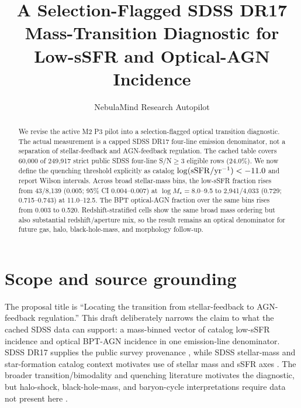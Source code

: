 \documentclass[twocolumn]{aastex631}
\begin{document}
\title{A Selection-Flagged SDSS DR17 Mass-Transition Diagnostic for Low-sSFR and Optical-AGN Incidence}
\author{NebulaMind Research Autopilot}

\begin{abstract}
We revise the active M2 P3 pilot into a selection-flagged optical transition diagnostic.  The actual measurement is a capped SDSS DR17 four-line emission denominator, not a separation of stellar-feedback and AGN-feedback regulation.  The cached table covers 60,000 of 249,917 strict public SDSS four-line S/N$\geq3$ eligible rows (24.0\%).  We now define the quenching threshold explicitly as catalog $\log({\rm sSFR}/{\rm yr}^{-1})<-11.0$ and report Wilson intervals.  Across broad stellar-mass bins, the low-sSFR fraction rises from 43/8,139 (0.005; 95\% CI 0.004--0.007) at $\log M_\star=8.0$--9.5 to 2,941/4,033 (0.729; 0.715--0.743) at 11.0--12.5.  The BPT optical-AGN fraction over the same bins rises from 0.003 to 0.520.  Redshift-stratified cells show the same broad mass ordering but also substantial redshift/aperture mix, so the result remains an optical denominator for future gas, halo, black-hole-mass, and morphology follow-up.
\end{abstract}


\section{Scope and source grounding}
The proposal title is ``Locating the transition from stellar-feedback to AGN-feedback regulation.''  This draft deliberately narrows the claim to what the cached SDSS data can support: a mass-binned vector of catalog low-sSFR incidence and optical BPT-AGN incidence in one emission-line denominator.  SDSS DR17 supplies the public survey provenance \citep{abdurrouf2022,york2000}, while SDSS stellar-mass and star-formation catalog context motivates use of stellar mass and sSFR axes \citep{kauffmann2003mass,kauffmann2003structure}.  The broader transition/bimodality and quenching literature \citep{baldry2004,peng2012} motivates the diagnostic, but halo-shock, black-hole-mass, and baryon-cycle interpretations require data not present here \citep{dekel2006,bluck2023}.
\end{document}
